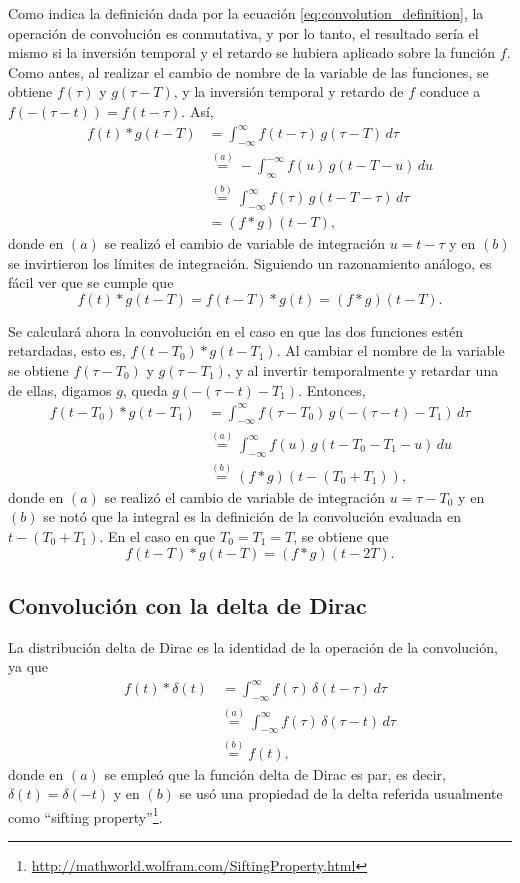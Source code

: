 \documentclass[a4paper]{article}
\begin{document}
Como indica la definición dada por la ecuación \ref{eq:convolution_definition}, la operación de convolución es conmutativa, y por lo tanto, el resultado sería el mismo si la inversión temporal y el retardo se hubiera aplicado sobre la función \(f\). Como antes, al realizar el cambio de nombre de la variable de las funciones, se obtiene \(f(\tau)\) y \(g(\tau-T)\), y la inversión temporal y retardo de \(f\) conduce a \(f(-(\tau-t))=f(t-\tau)\). Así,
\begin{align*}
 f(t)*g(t-T)&=\int _{-\infty }^{\infty }f(t-\tau)\,g(\tau-T)\,d\tau \\
   &\overset{(a)}{=}-\int_{\infty }^{-\infty }f(u)\,g(t-T-u)\,du \\
   &\overset{(b)}{=}\int_{-\infty }^{\infty }f(\tau)\,g(t-T-\tau)\,d\tau \\
   &=(f*g)(t-T),
\end{align*}
donde en \((a)\) se realizó el cambio de variable de integración \(u=t-\tau\) y en \((b)\) se invirtieron los límites de integración. Siguiendo un razonamiento análogo, es fácil ver que se cumple que
\[
 f(t)*g(t-T) = f(t-T)*g(t) = (f*g)(t-T).
\]

Se calculará ahora la convolución en el caso en que las dos funciones estén retardadas, esto es, \(f(t-T_0)*g(t-T_1)\). Al cambiar el nombre de la variable se obtiene \(f(\tau-T_0)\) y \(g(\tau-T_1)\), y al invertir temporalmente y retardar una de ellas, digamos \(g\), queda \(g(-(\tau-t)-T_1)\). Entonces,
\begin{align*}
 f(t-T_0)*g(t-T_1)&=\int_{-\infty }^{\infty }f(\tau-T_0)\,g(-(\tau-t)-T_1)\,d\tau \\
   &\overset{(a)}{=}\int_{-\infty }^{\infty }f(u)\,g(t-T_0-T_1-u)\,du \\
   &\overset{(b)}{=}(f*g)(t-(T_0+T_1)),
\end{align*}
donde en \((a)\) se realizó el cambio de variable de integración \(u=\tau-T_0\) y en \((b)\) se notó que la integral es la definición de la convolución evaluada en \(t-(T_0+T_1)\). En el caso en que \(T_0=T_1=T\), se obtiene que
\[
 f(t-T)*g(t-T)=(f*g)(t-2T).
\]

\subsection{Convolución con la delta de Dirac}

La distribución delta de Dirac es la identidad de la operación de la convolución, ya que
\begin{align*}
 f(t)*\delta(t)&\,=\int_{-\infty }^{\infty }f(\tau)\,\delta(t-\tau)\,d\tau \\
   &\overset{(a)}{=}\int_{-\infty }^{\infty }f(\tau)\,\delta(\tau-t)\,d\tau \\
   &\overset{(b)}{=}f(t),
\end{align*}
donde en \((a)\) se empleó que la función delta de Dirac es par, es decir, \(\delta(t)=\delta(-t)\) y en \((b)\) se usó una propiedad de la delta referida usualmente como ``sifting property''\footnote{\url{http://mathworld.wolfram.com/SiftingProperty.html}}.
\end{document}
